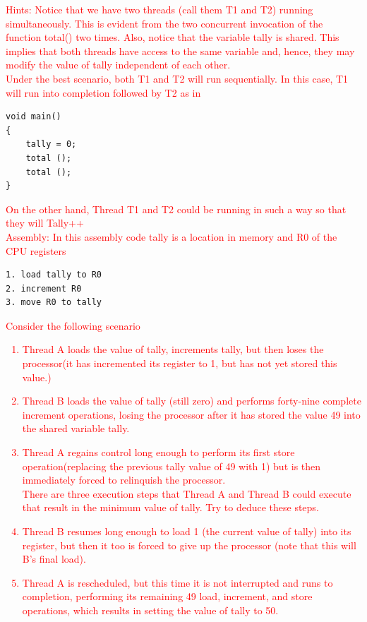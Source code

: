 \documentclass[12pt]{article}
\newenvironment{sol}[1][Solution]{\begin{trivlist}\item[\hskip\labelsep {\bfseries #1:}]}{\end{trivlist}}
\begin{document}
\begin{enumerate}
\begin{sol}
\end{sol}
\textcolor{red}{Hints: Notice that we have two threads (call them T1 and T2) running simultaneously. This is evident from the two concurrent invocation of the function total() two times. Also, notice that the variable tally is shared. This implies that both threads have access to the same variable and, hence, they may modify the value of tally independent of each other.\\
Under the best scenario, both T1 and T2 will run sequentially. In this case, T1 will run into completion followed by T2 as in }
 \begin{verbatim}
void main()
{
    tally = 0;
    total (); 
    total ();
}
\end{verbatim}
\textcolor{red}{On the other hand, Thread T1 and T2 could be running in such a way so that they will Tally++\\
Assembly: In this assembly code tally is a location in memory and R0 of the CPU registers}
 \begin{verbatim}
1. load tally to R0
2. increment R0
3. move R0 to tally
\end{verbatim}
\textcolor{red}{Consider the following scenario
\begin{enumerate}
    \item[(1)] Thread A loads the value of tally, increments tally, but then loses the processor(it has incremented its register to 1, but has not yet stored this value.)
    \item[(2)] Thread B loads the value of tally (still zero) and performs forty-nine complete increment operations, losing the processor after it has stored the value 49 into the shared variable tally.
    \item[(3)] Thread A regains control long enough to perform its first store operation(replacing the previous tally value of 49 with 1) but is then immediately forced to relinquish the processor.\\
    There are three execution steps that Thread A and Thread B could execute that result in the minimum value of tally. Try to deduce these steps.
    \item[(4)] Thread B resumes long enough to load 1 (the current value of tally) into its register, but then it too is forced to give up the processor (note that this will B's final load).
    \item[(5)] Thread A is rescheduled, but this time it is not interrupted and runs to completion, performing its remaining 49 load, increment, and store operations, which results in setting the value of tally to 50.

\end{enumerate}}
\end{enumerate}
\end{document}
